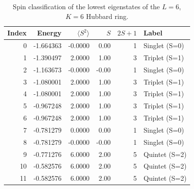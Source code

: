 \begin{table}[htbp]
  \centering
  \caption{Spin classification of the lowest eigenstates of the $L=6$, $K=6$ Hubbard ring.}
  \label{tab:spin-l6-ne6-66deac}
  \begin{tabular}{rrrrrl}
    \hline\hline
    Index & Energy & $\langle S^2\rangle$ & $S$ & $2S+1$ & Label \\
    \hline
    0 & -1.664363 & -0.0000 & 0.00 & 1 & Singlet (S=0) \\
    1 & -1.390497 & 2.0000 & 1.00 & 3 & Triplet (S=1) \\
    2 & -1.163673 & -0.0000 & -0.00 & 1 & Singlet (S=0) \\
    3 & -1.080001 & 2.0000 & 1.00 & 3 & Triplet (S=1) \\
    4 & -1.080001 & 2.0000 & 1.00 & 3 & Triplet (S=1) \\
    5 & -0.967248 & 2.0000 & 1.00 & 3 & Triplet (S=1) \\
    6 & -0.967248 & 2.0000 & 1.00 & 3 & Triplet (S=1) \\
    7 & -0.781279 & 0.0000 & 0.00 & 1 & Singlet (S=0) \\
    8 & -0.781279 & -0.0000 & -0.00 & 1 & Singlet (S=0) \\
    9 & -0.771276 & 6.0000 & 2.00 & 5 & Quintet (S=2) \\
    10 & -0.582576 & 6.0000 & 2.00 & 5 & Quintet (S=2) \\
    11 & -0.582576 & 6.0000 & 2.00 & 5 & Quintet (S=2) \\
    \hline\hline
  \end{tabular}
\end{table}

